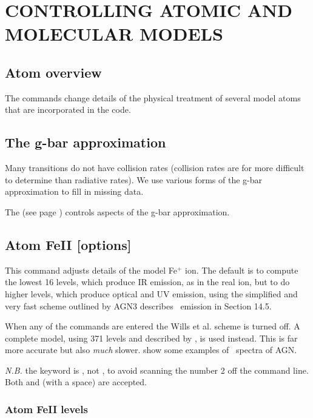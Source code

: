 \chapter{CONTROLLING ATOMIC AND MOLECULAR MODELS}

\section{Atom overview}

The  commands change details of the physical treatment of several
model atoms that are incorporated in the code.

\section{The g-bar approximation}

Many transitions do not have collision rates
(collision rates are for more difficult to determine than radiative rates).
We use various forms of the g-bar approximation to fill in missing data.

The  (see page \pageref{sec:Setgbar}) controls aspects
of the g-bar approximation.

\section{Atom FeII [options]}
\label{sec:AtomFeIICommand}

This command adjusts details of the model Fe$^+$ ion.
The default is to
compute the lowest 16 levels, which produce IR emission, as in the real
ion, but to do higher levels, which produce optical and UV emission, using
the simplified and very fast scheme outlined by \citet{Wills1985}
AGN3 describes \feii\ emission in Section 14.5.

When any of the  commands are entered
the Wills et al. scheme is turned off.
A complete model, using 371 levels and described by \citet{Verner1999}, is used instead.
This is far more accurate but also \emph{much} slower.
\citet{Baldwin2004} show some examples of \feii\ spectra of AGN.

\emph{N.B.} the keyword is , not ,
to avoid scanning the number 2 off the command line.
Both  and  (with a space) are accepted.

\subsection{Atom FeII levels}

